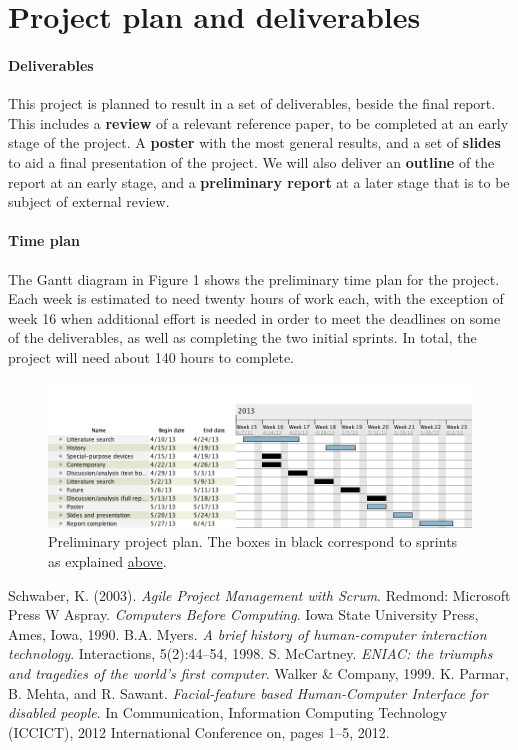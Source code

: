 \documentclass[a4paper,10pt]{article}
\begin{document}
\section{Project plan and deliverables}
\paragraph{Deliverables}
This project is planned to result in a set of deliverables, beside the final report. This includes a \textbf{review} of a relevant reference paper, to be completed at an early stage of the project. A \textbf{poster} with the most general results, and a set of \textbf{slides} to aid a final presentation of the project. We will also deliver an \textbf{outline} of the report at an early stage, and a \textbf{preliminary report} at a later stage that is to be subject of external review.


\paragraph{Time plan}

The Gantt diagram in Figure 1 shows the preliminary time plan for the project. Each week is estimated to need twenty hours of work each, with the exception of week 16 when additional effort is needed in order to meet the deadlines on some of the deliverables, as well as completing the two initial sprints. In total, the project will need about 140 hours to complete.

\begin{figure}[h!]
\includegraphics[width=\textwidth]{ganttuppsats.png}
\caption{Preliminary project plan. The boxes in black correspond to sprints as explained \hyperref[sec:method]{above}.}
\label{fig:timePlan}
\end{figure}


\begin{thebibliography}{4}
 Schwaber, K. (2003). \emph{Agile Project Management with Scrum}. Redmond: Microsoft Press
 W Aspray. \emph{Computers Before Computing}. Iowa State University Press, Ames, Iowa, 1990.
B.A. Myers. \emph{A brief history of human-computer interaction technology}. Interactions, 5(2):44–54, 1998.
S. McCartney. \emph{ENIAC: the triumphs and tragedies of the world’s first computer}. Walker \& Company, 1999.
K. Parmar, B. Mehta, and R. Sawant. \emph{Facial-feature based Human-Computer Interface for disabled people}. In Communication, Information Computing Technology (ICCICT), 2012 International Conference on, pages 1–5, 2012.


\end{thebibliography}
\end{document}
